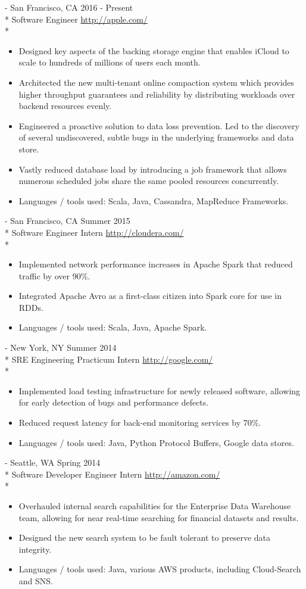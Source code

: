 \documentclass[overlapped,line]{resume}
\newcommand{\rurl}[1]{\hfill {\footnotesize \url{#1}}}
\newcommand{\rdate}[1]{\hfill {\small #1}}
\renewcommand{\employer}[5]{ \item[#1] - #2 \rdate{#3} \\* #4 \rurl{#5} \\* \vspace{-5mm}}
\begin{document}
\begin{resume}
  \begin{asparadesc}
    \employer{Apple Inc. (iCloud)}{San Francisco, CA}{2016 - Present}{Software
      Engineer}{http://apple.com/}
    \begin{itemize}
      \item Designed key aspects of the backing storage engine that enables iCloud to scale to
        hundreds of millions of users each month.
      \item Architected the new multi-tenant online compaction system which provides higher
        throughput guarantees and reliability by distributing workloads over backend resources
        evenly.
      \item Engineered a proactive solution to data loss prevention. Led to the discovery of
        several undiscovered, subtle bugs in the underlying frameworks and data store.
      \item Vastly reduced database load by introducing a job framework that allows numerous
        scheduled jobs share the same pooled resources concurrently.
      \item Languages / tools used: Scala, Java, Cassandra, MapReduce Frameworks.
    \end{itemize}
    \employer{Cloudera}{San Francisco, CA}{Summer 2015}{Software Engineer
      Intern}{http://cloudera.com/}
    \begin{itemize}
      \item Implemented network performance increases in Apache Spark that reduced traffic by over
        90\%.
      \item Integrated Apache Avro as a first-class citizen into Spark core for use in RDDs.
      \item Languages / tools used: Scala, Java, Apache Spark.
    \end{itemize}
    \employer{Google}{New York, NY}{Summer 2014}{SRE Engineering Practicum
      Intern}{http://google.com/}
    \begin{itemize}
      \item Implemented load testing infrastructure for newly released software, allowing for early
        detection of bugs and performance defects.
      \item Reduced request latency for back-end monitoring services by 70\%.
      \item Languages / tools used: Java, Python Protocol Buffers, Google data stores.
    \end{itemize}
    \employer{Amazon}{Seattle, WA}{Spring 2014}{Software Developer Engineer
      Intern}{http://amazon.com/}
    \begin{itemize}
      \item Overhauled internal search capabilities for the Enterprise Data Warehouse team, allowing
        for near real-time searching for financial datasets and results.
      \item Designed the new search system to be fault tolerant to preserve data integrity.
      \item Languages / tools used: Java, various AWS products, including Cloud-Search and SNS.
    \end{itemize}
  \end{asparadesc}


\end{resume}
\end{document}
